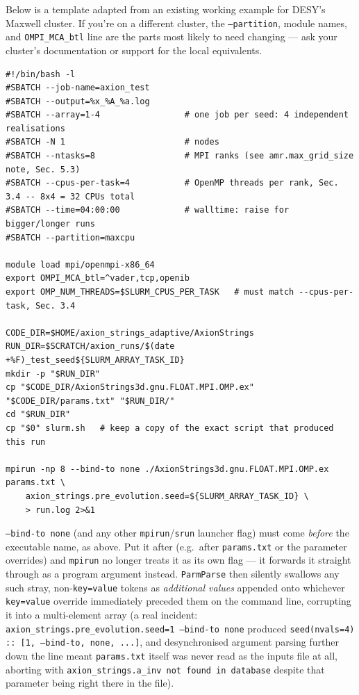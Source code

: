 \documentclass[11pt]{article}
\begin{document}
Below is a template adapted from an existing working example for DESY's Maxwell cluster. If you're on a
different cluster, the \texttt{--partition}, module names, and \texttt{OMPI\_MCA\_btl} line are the parts
most likely to need changing --- ask your cluster's documentation or support for the local equivalents.

\begin{lstlisting}
#!/bin/bash -l
#SBATCH --job-name=axion_test
#SBATCH --output=%x_%A_%a.log
#SBATCH --array=1-4                 # one job per seed: 4 independent realisations
#SBATCH -N 1                        # nodes
#SBATCH --ntasks=8                  # MPI ranks (see amr.max_grid_size note, Sec. 5.3)
#SBATCH --cpus-per-task=4           # OpenMP threads per rank, Sec. 3.4 -- 8x4 = 32 CPUs total
#SBATCH --time=04:00:00             # walltime: raise for bigger/longer runs
#SBATCH --partition=maxcpu

module load mpi/openmpi-x86_64
export OMPI_MCA_btl=^vader,tcp,openib
export OMP_NUM_THREADS=$SLURM_CPUS_PER_TASK   # must match --cpus-per-task, Sec. 3.4

CODE_DIR=$HOME/axion_strings_adaptive/AxionStrings
RUN_DIR=$SCRATCH/axion_runs/$(date +%F)_test_seed${SLURM_ARRAY_TASK_ID}
mkdir -p "$RUN_DIR"
cp "$CODE_DIR/AxionStrings3d.gnu.FLOAT.MPI.OMP.ex" "$CODE_DIR/params.txt" "$RUN_DIR/"
cd "$RUN_DIR"
cp "$0" slurm.sh   # keep a copy of the exact script that produced this run

mpirun -np 8 --bind-to none ./AxionStrings3d.gnu.FLOAT.MPI.OMP.ex params.txt \
    axion_strings.pre_evolution.seed=${SLURM_ARRAY_TASK_ID} \
    > run.log 2>&1
\end{lstlisting}

\begin{warn}
\texttt{--bind-to none} (and any other \texttt{mpirun}/\texttt{srun} launcher flag) must come
\emph{before} the executable name, as above. Put it after (e.g.\ after \texttt{params.txt} or the
parameter overrides) and \texttt{mpirun} no longer treats it as its own flag --- it forwards it straight
through as a program argument instead. \texttt{ParmParse} then silently swallows any such stray,
non-\texttt{key=value} tokens as \emph{additional values} appended onto whichever \texttt{key=value}
override immediately preceded them on the command line, corrupting it into a multi-element array (a
real incident: \texttt{axion\_strings.pre\_evolution.seed=1 --bind-to none} produced
\texttt{seed(nvals=4) :: [1, --bind-to, none, ...]}, and desynchronised argument parsing further down
the line meant \texttt{params.txt} itself was never read as the inputs file at all, aborting with
\texttt{axion\_strings.a\_inv not found in database} despite that parameter being right there in the
file).
\end{warn}
\end{document}
